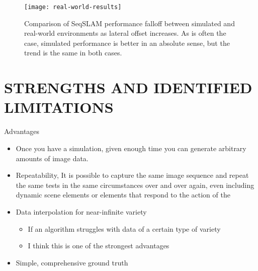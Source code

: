 \documentclass[letterpaper, 10 pt, conference]{ieeeconf}  %
\begin{document}
\begin{figure}[t]
    \texttt{[image: real-world-results]}
    \caption{Comparison of SeqSLAM performance falloff between simulated and real-world environments as lateral offset increases. As is often the case, simulated performance is better in an absolute sense, but the trend is the same in both cases.}
    \label{fig:real-world-results}
\end{figure}




\section{STRENGTHS AND IDENTIFIED LIMITATIONS}

Advantages
\begin{itemize}
    \item Once you have a simulation, given enough time you can generate arbitrary amounts of image data.
    \item Repeatability, It is possible to capture the same image sequence and repeat the same tests in the same circumstances over and over again, even including dynamic scene elements or elements that respond to the action of the
    \item Data interpolation for near-infinite variety
    \begin{itemize}
        \item If an algorithm struggles with data of a certain type of variety
        \item I think this is one of the strongest advantages
    \end{itemize}
    \item Simple, comprehensive ground truth
\end{itemize}
\end{document}
